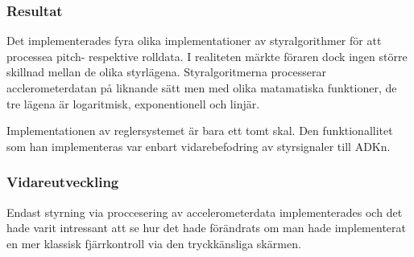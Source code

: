 \subsubsection{Resultat}
Det implementerades fyra olika implementationer av styralgorithmer för att
processea pitch- respektive rolldata. I realiteten märkte föraren dock ingen
större skillnad mellan de olika styrlägena. Styralgoritmerna processerar
acclerometerdatan på liknande sätt men med olika matamatiska funktioner, de tre
lägena är logaritmisk, exponentionell och linjär.

Implementationen av reglersystemet är bara ett tomt skal. Den funktionallitet
som han implementeras var enbart vidarebefodring av styrsignaler till ADKn.

\subsubsection{Vidareutveckling}
Endast styrning via proccesering av accelerometerdata implementerades och det
hade varit intressant att se hur det hade förändrats om man hade implementerat
en mer klassisk fjärrkontroll via den tryckkänsliga skärmen.
